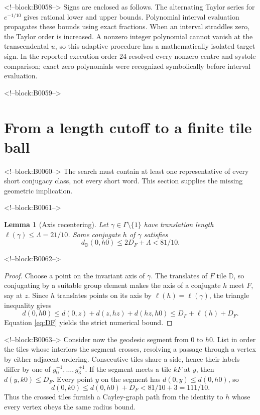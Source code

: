 \documentclass[11pt,a4paper]{article}
\newtheorem{lemma}[theorem]{Lemma}
\theoremstyle{definition}
\newcommand{\D}{\mathbb D}
\newcommand{\length}{\ell}
\begin{document}
<!--block:B0058-->
Signs are enclosed as follows.  The alternating Taylor series for
\(e^{-1/10}\) gives rational lower and upper bounds.  Polynomial interval
evaluation propagates these bounds using exact fractions.  When an interval
straddles zero, the Taylor order is increased.  A nonzero integer polynomial
cannot vanish at the transcendental \(u\), so this adaptive procedure has a
mathematically isolated target sign.  In the reported execution order 24
resolved every nonzero centre and systole comparison; exact zero polynomials
were recognized symbolically before interval evaluation.

<!--block:B0059-->
\section{From a length cutoff to a finite tile ball}
\label{sec:completeness}

<!--block:B0060-->
The search must contain at least one representative of every short
conjugacy class, not every short word.  This section supplies the missing
geometric implication.

<!--block:B0061-->
\begin{lemma}[Axis recentering]\label{lem:recenter}
Let \(\gamma\in\Gamma\setminus\{1\}\) have translation length
\(\length(\gamma)\leq\Lambda=21/10\).  Some conjugate \(h\) of \(\gamma\)
satisfies
\[
 d_{\D}(0,h0)\leq2D_F+\Lambda<81/10.
\]
\end{lemma}

<!--block:B0062-->
\begin{proof}
Choose a point on the invariant axis of \(\gamma\).  The translates of \(F\)
tile \(\D\), so conjugating by a suitable group element makes the axis of a
conjugate \(h\) meet \(F\), say at \(z\).  Since \(h\) translates points on its
axis by \(\length(h)=\length(\gamma)\), the triangle inequality gives
\[
 d(0,h0)\leq d(0,z)+d(z,hz)+d(hz,h0)
 \leq D_F+\length(h)+D_F.
\]
Equation \eqref{eq:DF} yields the strict numerical bound.
\end{proof}

<!--block:B0063-->
Consider now the geodesic segment from \(0\) to \(h0\).  List in order the
tiles whose interiors the segment crosses, resolving a passage through a
vertex by either adjacent ordering.  Consecutive tiles share a side, hence
their labels differ by one of
\(g_0^{\pm1},\ldots,g_3^{\pm1}\).  If the segment meets a tile \(kF\) at
\(y\), then \(d(y,k0)\leq D_F\).  Every point \(y\) on the segment has
\(d(0,y)\leq d(0,h0)\), so
\begin{equation}\label{eq:chain-radius}
 d(0,k0)\leq d(0,h0)+D_F<81/10+3=111/10.
\end{equation}
Thus the crossed tiles furnish a Cayley-graph path from the identity to \(h\)
whose every vertex obeys the same radius bound.
\end{document}
